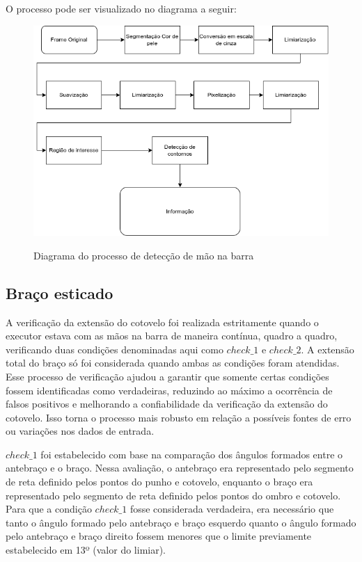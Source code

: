 O processo pode ser visualizado no diagrama a seguir:
\begin{figure}[H]
	\centering
    \caption{Diagrama do processo de detecção de mão na barra}
	\includegraphics[scale=0.7]{figuras/diagrama/mao_barra.png}
	\label{dia:mao_barra}
\end{figure}

\subsection[Braço esticado]{Braço esticado}\label{sec:Braco esticado}

A verificação da extensão do cotovelo foi realizada estritamente quando o executor estava com as mãos na barra de maneira contínua, quadro a quadro, verificando duas condições denominadas aqui como $check\_1$ e $check\_2$. A extensão total do braço só foi considerada quando ambas as condições foram atendidas. Esse processo de verificação ajudou a garantir que somente certas condições fossem identificadas como verdadeiras, reduzindo ao máximo a ocorrência de falsos positivos e melhorando a confiabilidade da verificação da extensão do cotovelo. Isso torna o processo mais robusto em relação a possíveis fontes de erro ou variações nos dados de entrada.


$check\_1$ foi estabelecido com base na comparação dos ângulos formados entre o antebraço e o braço. Nessa avaliação, o antebraço era representado pelo segmento de reta definido pelos pontos do punho e cotovelo, enquanto o braço era representado pelo segmento de reta definido pelos pontos do ombro e cotovelo. Para que a condição $check\_1$ fosse considerada verdadeira, era necessário que tanto o ângulo formado pelo antebraço e braço esquerdo quanto o ângulo formado pelo antebraço e braço direito fossem menores que o limite previamente estabelecido em 13º (valor do limiar).\label{angulo_braco}


